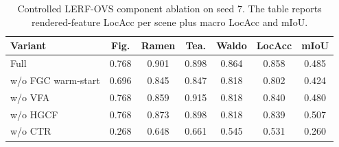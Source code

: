 \begin{table}[t]
\centering
\caption{Controlled LERF-OVS component ablation on seed 7. The table reports rendered-feature LocAcc per scene plus macro LocAcc and mIoU.}
\label{tab:component_ablation}
\footnotesize
\setlength{\tabcolsep}{2.5pt}
\begin{tabular}{lcccccc}
\toprule
Variant & Fig. & Ramen & Tea. & Waldo & LocAcc & mIoU \\
\midrule
Full \method{} & 0.768 & 0.901 & 0.898 & 0.864 & 0.858 & 0.485 \\
w/o FGC warm-start & 0.696 & 0.845 & 0.847 & 0.818 & 0.802 & 0.424 \\
w/o VFA & 0.768 & 0.859 & 0.915 & 0.818 & 0.840 & 0.480 \\
w/o HGCF & 0.768 & 0.873 & 0.898 & 0.818 & 0.839 & 0.507 \\
w/o CTR & 0.268 & 0.648 & 0.661 & 0.545 & 0.531 & 0.260 \\
\bottomrule
\end{tabular}
\end{table}
